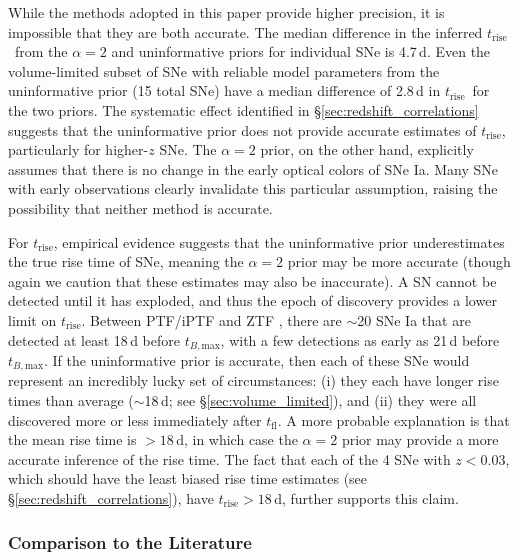 \documentclass[twocolumn]{./aastex63}
\newcommand{\tfl}{$t_\mathrm{fl}$}
\newcommand{\trise}{$t_\mathrm{rise}$}
\newcommand{\tbmax}{$t_{B,\mathrm{max}}$}
\begin{document}
While the methods adopted in this paper provide higher precision, it is
impossible that they are both accurate. The median difference in the inferred
\trise\ from the $\alpha = 2$ and uninformative priors for individual SNe is
4.7\,d. Even the volume-limited subset of SNe with reliable model parameters
from the uninformative prior (15 total SNe) have a median difference of 2.8\,d
in \trise\ for the two priors. The systematic effect identified in
\S\ref{sec:redshift_correlations} suggests that the uninformative prior does
not provide accurate estimates of \trise, particularly for higher-$z$ SNe. The
$\alpha = 2$ prior, on the other hand, explicitly assumes that there is no
change in the early optical colors of SNe Ia. Many SNe with early observations
clearly invalidate this particular assumption, raising the possibility that
neither method is accurate.

For \trise, empirical evidence suggests that the uninformative prior
underestimates the true rise time of SNe, meaning the $\alpha = 2$ prior may
be more accurate (though again we caution that these estimates may also be
inaccurate). A SN cannot be detected until it has exploded, and thus the epoch
of discovery provides a lower limit on \trise. Between PTF/iPTF
\citep{Papadogiannakis19} and ZTF \citep{Yao19}, there are $\sim$20 SNe Ia
that are detected at least 18\,d before \tbmax, with a few detections as early
as 21\,d before \tbmax. If the uninformative prior is accurate, then each of
these SNe would represent an incredibly lucky set of circumstances: (i) they
each have longer rise times than average ($\sim$18\,d; see
\S\ref{sec:volume_limited}), and (ii) they were all discovered more or less
immediately after \tfl. A more probable explanation is that the mean rise time
is $> 18$\,d, in which case the $\alpha = 2$ prior may provide a more accurate
inference of the rise time. The fact that each of the 4 SNe with $z < 0.03$,
which should have the least biased rise time estimates (see
\S\ref{sec:redshift_correlations}), have \trise$ > 18$\,d, further supports
this claim.

\subsubsection{Comparison to the Literature}
\end{document}
